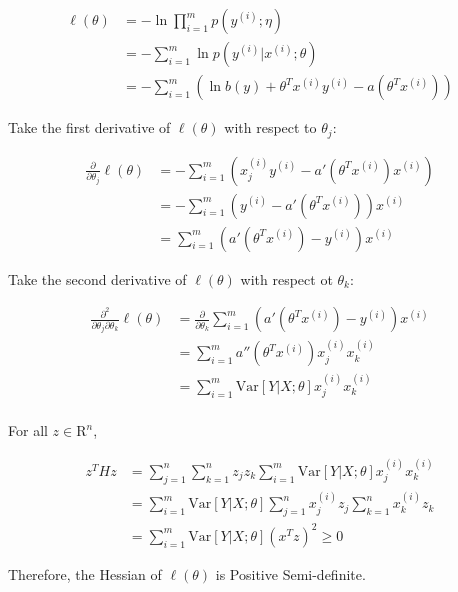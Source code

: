 \begin{answer}
	$$
	\begin{aligned}
		\ell(\theta) & = -\ln \prod_{i = 1}^{m} p(y^{(i)}; \eta)\\
		& = -\sum_{i = 1}^{m} \ln p(y^{(i)} | x^{(i)}; \theta)\\
		& = -\sum_{i = 1}^{m} (\ln b(y) + \theta^T x^{(i)} y^{(i)} - a(\theta^T x^{(i)}))
	\end{aligned}
	$$
	
	Take the first derivative of $\ell(\theta)$ with respect to $\theta_j$:
	
	$$
	\begin{aligned}
		\frac{\partial}{\partial\theta_j} \ell(\theta) & = -\sum_{i = 1}^m (x^{(i)}_j y^{(i)} - a'(\theta^T x^{(i)}) x^{(i)})\\
		& = -\sum_{i = 1}^m (y^{(i)} - a'(\theta^T x^{(i)})) x^{(i)}\\
		& = \sum_{i = 1}^m (a'(\theta^T x^{(i)}) - y^{(i)}) x^{(i)}
	\end{aligned}
	$$

	Take the second derivative of $\ell(\theta)$ with respect ot $\theta_k$:
	
	$$
	\begin{aligned}
		\frac{\partial^2}{\partial\theta_j\partial\theta_k} \ell(\theta) & = \frac{\partial}{\partial\theta_k} \sum_{i = 1}^m (a'(\theta^T x^{(i)}) - y^{(i)}) x^{(i)}\\
		& = \sum_{i = 1}^m a''(\theta^T x^{(i)}) x^{(i)}_j x^{(i)}_k\\
		& = \sum_{i = 1}^m \mathrm{Var}[Y | X; \theta] x^{(i)}_j x^{(i)}_k\\
	\end{aligned}
	$$
	
	For all $z \in \mathrm R^n$,
	
	$$
	\begin{aligned}
		z^T H z & = \sum_{j = 1}^n \sum_{k = 1}^n z_j z_k \sum_{i = 1}^m \mathrm{Var}[Y | X; \theta] x^{(i)}_j x^{(i)}_k\\
		& = \sum_{i = 1}^m \mathrm{Var}[Y | X; \theta] \sum_{j = 1}^n x^{(i)}_j z_j \sum_{k = 1}^n x^{(i)}_k z_k\\
		& = \sum_{i = 1}^m \mathrm{Var}[Y | X; \theta] (x^T z)^2 \ge 0
	\end{aligned}
	$$
	
	Therefore, the Hessian of $\ell(\theta)$ is Positive Semi-definite.
\end{answer}
